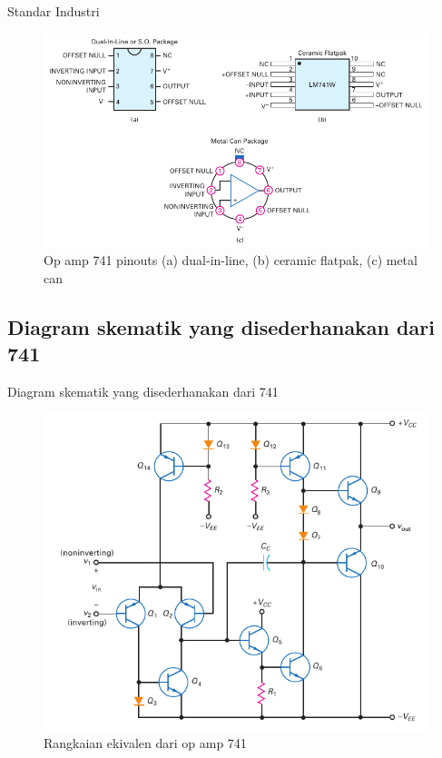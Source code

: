 \begin{frame}{Standar Industri}
	\begin{figure}
		\centering
		\includegraphics[width=0.7\linewidth]{gambar/fig-16.03}
		\caption{Op amp 741 pinouts (a) dual-in-line, (b) ceramic flatpak, (c) metal can}
		\label{fig-16.03}
	\end{figure}
\end{frame}

\subsection{Diagram skematik yang disederhanakan dari 741}

\begin{frame}{Diagram skematik yang disederhanakan dari 741}
	\begin{figure}
		\centering
		\includegraphics[height=0.9\textheight]{gambar/fig-16.04}
		\caption{Rangkaian ekivalen dari op amp 741}
		\label{fig-16.04}
	\end{figure}
\end{frame}

